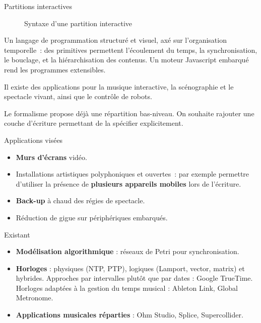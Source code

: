 \begin{block}{Partitions interactives}
\begin{figure}
\caption{Syntaxe d'une partition interactive}
\end{figure}
Un langage de programmation structuré et visuel, axé sur l'organisation temporelle~: des primitives permettent l'écoulement du temps, la synchronisation, le bouclage, et la hiérarchisation des contenus.
Un moteur Javascript embarqué rend les programmes extensibles.

Il existe des applications pour la musique interactive, la scénographie et le spectacle vivant, ainsi que le contrôle de robots.

Le formalisme propose déjà une répartition bas-niveau.
On souhaite rajouter une couche d'écriture permettant de la spécifier explicitement.
\end{block}

\begin{block}{Applications visées}
    \begin{itemize}
        \item \textbf{Murs d'écrans} vidéo.
        \item Installations artistiques polyphoniques et ouvertes~: 
        par exemple permettre d'utiliser la présence de \textbf{plusieurs appareils mobiles} 
        lors de l'écriture.
        \item \textbf{Back-up} à chaud des régies de spectacle.
        \item Réduction de gigue sur périphériques embarqués.
    \end{itemize}
\end{block}

\begin{block}{Existant}
\begin{itemize}
    \item \textbf{Modélisation algorithmique} : réseaux de Petri pour synchronisation. 
    \item \textbf{Horloges} : physiques (NTP\cite{mills1991internet}, PTP\cite{peng2009research}), logiques (Lamport\cite{lamport1978time}, vector, matrix) et hybrides\cite{kulkarni2014logical}.
    Approches par intervalles plutôt que par dates : Google TrueTime.
    Horloges adaptées à la gestion du temps musical : Ableton Link, Global Metronome\cite{oda2016global}.
    \item 
    \textbf{Applications musicales réparties} : Ohm Studio, Splice, Supercollider\cite{carot2007networked}.
\end{itemize}
\end{block}
